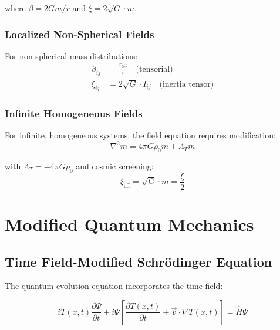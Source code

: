 \documentclass[twocolumn,aps,prl]{revtex4-2}
\newcommand{\Tfieldt}{T(x,t)}
\begin{document}
	where \(\beta = 2Gm/r\) and \(\xi = 2\sqrt{G} \cdot m\).
	
	\subsubsection{Localized Non-Spherical Fields}
	\label{subsubsec:nonsphere_fields}
	
	For non-spherical mass distributions:
	\begin{align}
		\beta_{ij} &= \frac{r_{0ij}}{r} \quad \text{(tensorial)} \\
		\xi_{ij} &= 2\sqrt{G} \cdot I_{ij} \quad \text{(inertia tensor)}
		\label{eq:tensorial_parameters}
	\end{align}
	
	\subsubsection{Infinite Homogeneous Fields}
	\label{subsubsec:infinite_fields}
	
	For infinite, homogeneous systems, the field equation requires modification:
	\begin{equation}
		\nabla^2 m = 4\pi G \rho_0 m + \Lambda_T m
		\label{eq:infinite_field_equation}
	\end{equation}
	
	with \(\Lambda_T = -4\pi G \rho_0\) and cosmic screening:
	\begin{equation}
		\xi_{\text{eff}} = \sqrt{G} \cdot m = \frac{\xi}{2}
		\label{eq:cosmic_screening}
	\end{equation}
	
	\section{Modified Quantum Mechanics}
	\label{sec:modified_quantum_mechanics}
	
	\subsection{Time Field-Modified Schrödinger Equation}
	\label{subsec:modified_schrodinger}
	
	The quantum evolution equation incorporates the time field:
	
	\begin{equation}
		i \Tfieldt \frac{\partial\Psi}{\partial t} + i \Psi \left[\frac{\partial \Tfieldt}{\partial t} + \vec{v} \cdot \nabla \Tfieldt\right] = \hat{H} \Psi
		\label{eq:t0_schrodinger_modified}
	\end{equation}
	
\end{document}
